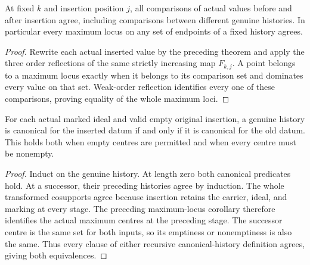\begin{corollary}
\label{hir:original-invariant-empty-comparisons}
\leanok
{}
At fixed $k$ and insertion position $j$, all comparisons of actual values
before and after insertion agree, including comparisons between different
genuine histories. In particular every maximum locus on any set of endpoints
of a fixed history agrees.
\end{corollary}
\begin{proof}
Rewrite each actual inserted value by the preceding theorem and apply the
three order reflections of the same strictly increasing map $F_{k,j}$.
A point belongs to a maximum locus exactly when it belongs to its comparison
set and dominates every value on that set. Weak-order reflection identifies
every one of these comparisons, proving equality of the whole maximum loci.
\end{proof}

\begin{corollary}
\label{hir:original-invariant-empty-canonical-histories}
\leanok
{}
For each actual marked ideal and valid empty original insertion, a genuine
history is canonical for the inserted datum if and only if it is canonical
for the old datum. This holds both when empty centres are permitted and when
every centre must be nonempty.
\end{corollary}
\begin{proof}
Induct on the genuine history. At length zero both canonical predicates hold.
At a successor, their preceding histories agree by induction. The whole
transformed cosupports agree because insertion retains the carrier, ideal,
and marking at every stage. The preceding maximum-locus corollary therefore
identifies the actual maximum centres at the preceding stage. The successor
centre is the same set for both inputs, so its emptiness or nonemptiness is
also the same. Thus every clause of either recursive canonical-history
definition agrees, giving both equivalences.
\end{proof}
